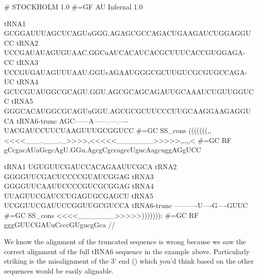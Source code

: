 \begin{sreoutput}
# STOCKHOLM 1.0
#=GF AU Infernal 1.0

tRNA1        GCGGAUUUAGCUCAGUuGGG.AGAGCGCCAGACUGAAGAUCUGGAGGUCC
tRNA2        UCCGAUAUAGUGUAAC.GGCuAUCACAUCACGCUUUCACCGUGGAGA-CC
tRNA3        UCCGUGAUAGUUUAAU.GGUcAGAAUGGGCGCUUGUCGCGUGCCAGA-UC
tRNA4        GCUCGUAUGGCGCAGU.GGU.AGCGCAGCAGAUUGCAAAUCUGUUGGUCC
tRNA5        GGGCACAUGGCGCAGUuGGU.AGCGCGCUUCCCUUGCAAGGAAGAGGUCA
tRNA6-trunc  AGC------A------.---.----UACGAUCCUUCUAAGUUUGCGGUCC
#=GC SS_cons (((((((,,<<<<___.___._>>>>,<<<<<_______>>>>>,,,,,<
#=GC RF      gCcgacAUaGcgcAgU.GGu.AgcgCgccagccUgucAagcuggAGgUCC

tRNA1        UGUGUUCGAUCCACAGAAUUCGCA
tRNA2        GGGGUUCGACUCCCCGUAUCGGAG
tRNA3        GGGGUUCAAUUCCCCGUCGCGGAG
tRNA4        UUAGUUCGAUCCUGAGUGCGAGCU
tRNA5        UCGGUUCGAUUCCGGUUGCGUCCA
tRNA6-trunc  ----------U----G----GUUC
#=GC SS_cons <<<<_______>>>>>))))))):
#=GC RF      gggGUUCGAUuCcccGUgucgGca
//
\end{sreoutput}

We know the alignment of the truncated sequence
 is wrong because we saw the correct alignment
of the full tRNA6 sequence in the example above. Particularly striking
is the misalignment of the 3' end () which you'd think
based on the other sequences would be easily alignable.

